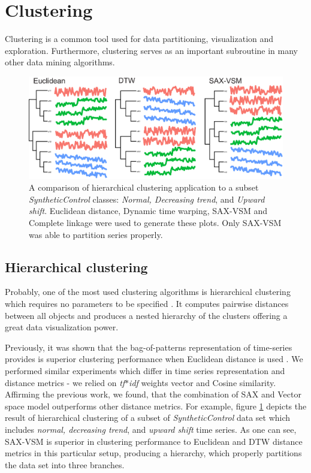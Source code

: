 \documentclass{llncs}
\newcommand{\myfigureshrinker}{\vspace{-1cm}}
\begin{document}
\section{Clustering}
Clustering is a common tool used for data partitioning, visualization and exploration. Furthermore, 
clustering serves as an important subroutine in many other data mining algorithms.
\begin{figure}[t]
   \myfigureshrinker
   \centering
   \includegraphics[width=115mm]{figures/clustering.eps}
   \caption{A comparison of hierarchical clustering application to a subset 
\textit{SyntheticControl} classes: \textit{Normal, Decreasing trend}, and \textit{Upward shift}. 
Euclidean distance, Dynamic time warping, SAX-VSM and Complete linkage were used to 
generate these plots. Only SAX-VSM was able to partition series properly.                           
   }
   \label{fig:hc}
\end{figure}

\subsection{Hierarchical clustering}
Probably, one of the most used clustering algorithms is hierarchical clustering which requires no
parameters to be specified \cite{hcs}. It computes pairwise distances between all objects and 
produces a nested hierarchy of the clusters offering a great data visualization power. 

Previously, it was shown that the bag-of-patterns representation of time-series
provides is superior clustering performance when Euclidean distance is used \cite{bag_patterns}. 
We performed similar experiments which differ in time series representation and distance
metrics - we relied on \textit{tf$\ast$idf} weights vector and Cosine similarity. 
Affirming the previous work, we found, that the combination of SAX and Vector space model
outperforms other distance metrics. For example, figure \ref{fig:hc} depicts the result 
of hierarchical clustering of a subset of \textit{SyntheticControl} data set which
includes \textit{normal, decreasing trend}, and \textit{upward shift} time series.
As one can see, SAX-VSM is superior in clustering performance to Euclidean and DTW distance 
metrics in this particular setup, producing a hierarchy, which properly partitions the data set 
into three branches.
\end{document}
